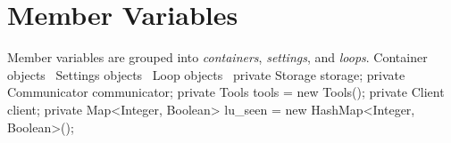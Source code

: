 \section{Member Variables}
Member variables are grouped into \emph{containers}, \emph{settings}, and
\emph{loops}.
\nwenddocs{}\endmoddef{}
\LA{}Container objects~{\nwtagstyle{}}\RA{}
\LA{}Settings objects~{\nwtagstyle{}}\RA{}
\LA{}Loop objects~{\nwtagstyle{}}\RA{}
\nwendcode{}\nwdocspar
{}
\nwenddocs{}\endmoddef{}
private Storage storage;
private Communicator communicator;
private Tools tools = new Tools();
private Client client;
private Map<Integer, Boolean> lu_seen = new HashMap<Integer, Boolean>();
\nwendcode{}\nwdocspar


